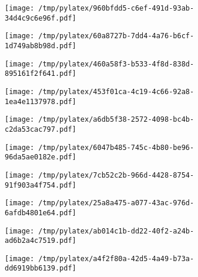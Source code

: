 \documentclass{article}
\begin{document}
\begin{figure}[htbp]
\begin{subfigure}[b]{.3\linewidth}
\texttt{[image: /tmp/pylatex/960bfdd5-c6ef-491d-93ab-34d4c9c6e96f.pdf]}
\end{subfigure}
\begin{subfigure}[b]{.3\linewidth}
\texttt{[image: /tmp/pylatex/60a8727b-7dd4-4a76-b6cf-1d749ab8b98d.pdf]}
\end{subfigure}
\begin{subfigure}[b]{.3\linewidth}
\texttt{[image: /tmp/pylatex/460a58f3-b533-4f8d-838d-895161f2f641.pdf]}
\end{subfigure}
\begin{subfigure}[b]{.3\linewidth}
\texttt{[image: /tmp/pylatex/453f01ca-4c19-4c66-92a8-1ea4e1137978.pdf]}
\end{subfigure}
\begin{subfigure}[b]{.3\linewidth}
\texttt{[image: /tmp/pylatex/a6db5f38-2572-4098-bc4b-c2da53cac797.pdf]}
\end{subfigure}
\begin{subfigure}[b]{.3\linewidth}
\texttt{[image: /tmp/pylatex/6047b485-745c-4b80-be96-96da5ae0182e.pdf]}
\end{subfigure}
\begin{subfigure}[b]{.3\linewidth}
\texttt{[image: /tmp/pylatex/7cb52c2b-966d-4428-8754-91f903a4f754.pdf]}
\end{subfigure}
\begin{subfigure}[b]{.3\linewidth}
\texttt{[image: /tmp/pylatex/25a8a475-a077-43ac-976d-6afdb4801e64.pdf]}
\end{subfigure}
\begin{subfigure}[b]{.3\linewidth}
\texttt{[image: /tmp/pylatex/ab014c1b-dd22-40f2-a24b-ad6b2a4c7519.pdf]}
\end{subfigure}
\begin{subfigure}[b]{.3\linewidth}
\texttt{[image: /tmp/pylatex/a4f2f80a-42d5-4a49-b73a-dd6919bb6139.pdf]}
\end{subfigure}
\end{figure}
\end{document}
